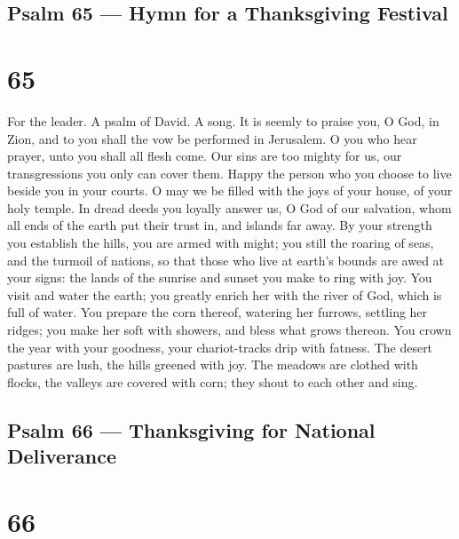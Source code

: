 \hypertarget{psalm-65-hymn-for-a-thanksgiving-festival}{%
\subsection{Psalm 65 --- Hymn for a Thanksgiving
Festival}\label{psalm-65-hymn-for-a-thanksgiving-festival}}

\hypertarget{section-64}{%
\section{65}\label{section-64}}

For the leader. A psalm of David. A song.  It is seemly to
praise you, O God, in Zion, and to you shall the vow be performed in
Jerusalem.  O you who hear prayer, unto you shall all flesh
come.  Our sins are too mighty for us, our transgressions
you only can cover them.  Happy the person who you choose to
live beside you in your courts. O may we be filled with the joys of your
house, of your holy temple.  In dread deeds you loyally
answer us, O God of our salvation, whom all ends of the earth put their
trust in, and islands far away.  By your strength you
establish the hills, you are armed with might;  you still
the roaring of seas, and the turmoil of nations,  so that
those who live at earth's bounds are awed at your signs: the lands of
the sunrise and sunset you make to ring with joy.  You visit
and water the earth; you greatly enrich her with the river of God, which
is full of water. You prepare the corn thereof,  watering
her furrows, settling her ridges; you make her soft with showers, and
bless what grows thereon.  You crown the year with your
goodness, your chariot-tracks drip with fatness.  The
desert pastures are lush, the hills greened with joy.  The
meadows are clothed with flocks, the valleys are covered with corn; they
shout to each other and sing.

\hypertarget{psalm-66-thanksgiving-for-national-deliverance}{%
\subsection{Psalm 66 --- Thanksgiving for National
Deliverance}\label{psalm-66-thanksgiving-for-national-deliverance}}

\hypertarget{section-65}{%
\section{66}\label{section-65}}

